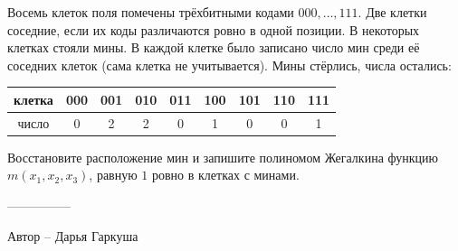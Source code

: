 \question
Восемь клеток поля помечены трёхбитными кодами $000,\dots,111$. Две клетки соседние, если их коды различаются ровно в одной позиции. В некоторых клетках стояли мины. В каждой клетке было записано число мин среди её соседних клеток (сама клетка не учитывается). Мины стёрлись, числа остались:
\begin{center}
\begin{tabular}{c|*{8}{c}}
клетка & 000 & 001 & 010 & 011 & 100 & 101 & 110 & 111 \\ \hline
число & 0 & 2 & 2 & 0 & 1 & 0 & 0 & 1
\end{tabular}
\end{center}
Восстановите расположение мин и запишите полиномом Жегалкина функцию $m(x_1,x_2,x_3)$, равную $1$ ровно в клетках с минами.

---------------

Автор -- Дарья Гаркуша